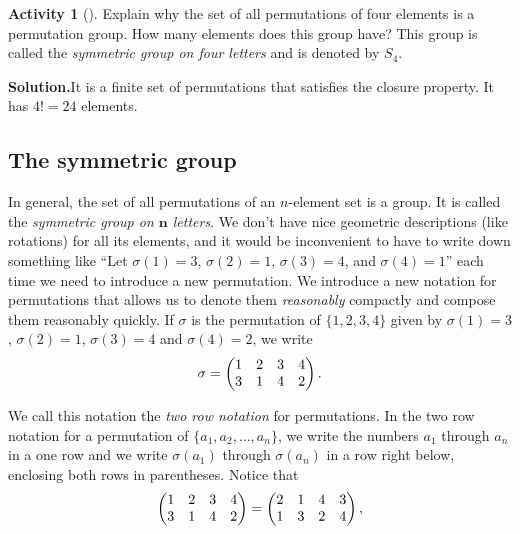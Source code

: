 \documentclass[10pt,]{book}
\theoremstyle{plain}
\theoremstyle{definition}
\newtheorem{activity}[project]{Activity}
\numberwithin{equation}{chapter}
\newcommand{\amp}{&}
\begin{document}
\begin{activity}[]\label{activity-260}
Explain why the set of all permutations of four elements is a permutation group. How many elements does this group have? This group is called the \emph{symmetric group on four letters} and is denoted by \(S_4\).%
\par\medskip\noindent%
\textbf{Solution.}\quad It is a finite set of permutations that satisfies the closure property. It has \(4!= 24\) elements.%
\end{activity}
\typeout{************************************************}
\typeout{************************************************}
\subsection[{The symmetric group}]{The symmetric group}\label{subsection-60}
In general, the set of all permutations of an \(n\)-element set is a group. It is called the \emph{symmetric group on \(\mathbf n\) letters}. We don't have nice geometric descriptions (like rotations) for all its elements, and it would be inconvenient to have to write down something like ``Let \(\sigma(1) =3\), \(\sigma(2) =1\), \(\sigma(3)=4\), and \(\sigma(4)=1\)'' each time we need to introduce a new permutation. We introduce a new notation for permutations that allows us to denote them \emph{reasonably} compactly and compose them reasonably quickly. If \(\sigma\) is the permutation of \(\{1,2,3,4\}\) given by \(\sigma(1)=3\), \(\sigma(2)=1\), \(\sigma(3) =4\) and \(\sigma(4) =2\), we write%
\begin{equation*}
\sigma =\left( \begin{matrix}1\amp 2\amp 3\amp 4\cr3\amp 1\amp 4\amp 2
\end{matrix} \right).
\end{equation*}
%
\par
We call this notation the \emph{two row notation} for permutations. In the two row notation for a permutation of \(\{a_1,a_2,\ldots, a_n\}\), we write the numbers \(a_1\) through \(a_n\) in a one row and we write \(\sigma(a_1)\) through \(\sigma(a_n)\) in a row right below, enclosing both rows in parentheses. Notice that%
\begin{equation*}
\left( \begin{matrix}1\amp 2\amp 3\amp 4\cr3\amp 1\amp 4\amp 2
\end{matrix} \right) = \left(
\begin{matrix}2\amp 1\amp 4\amp 3\cr1\amp 3\amp 2\amp 4
\end{matrix} \right),
\end{equation*}
\end{document}
